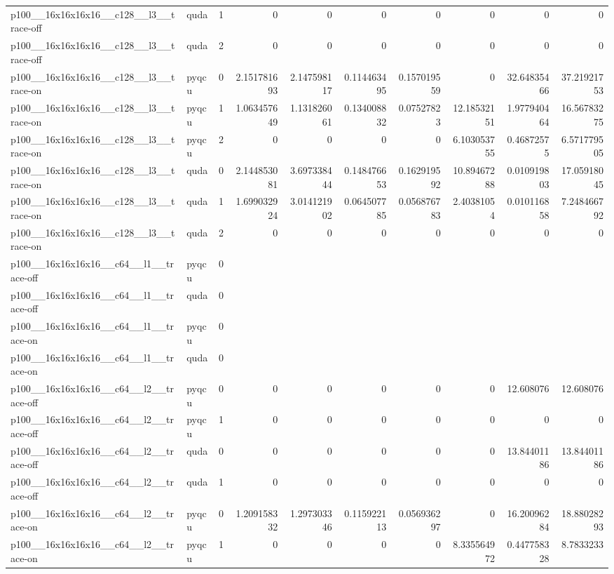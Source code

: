\begin{table}[htbp]
\begin{tabular}{@{}llrrrrrrrr@{}}
p100\_\_16x16x16x16\_\_c128\_\_l3\_\_trace-off & quda & 1 & 0 & 0 & 0 & 0 & 0 & 0 & 0 \\
p100\_\_16x16x16x16\_\_c128\_\_l3\_\_trace-off & quda & 2 & 0 & 0 & 0 & 0 & 0 & 0 & 0 \\
p100\_\_16x16x16x16\_\_c128\_\_l3\_\_trace-on & pyqcu & 0 & 2.151781693 & 2.147598117 & 0.114463495 & 0.157019559 & 0 & 32.64835466 & 37.21921753 \\
p100\_\_16x16x16x16\_\_c128\_\_l3\_\_trace-on & pyqcu & 1 & 1.063457649 & 1.131826061 & 0.134008832 & 0.07527823 & 12.18532151 & 1.977940464 & 16.56783275 \\
p100\_\_16x16x16x16\_\_c128\_\_l3\_\_trace-on & pyqcu & 2 & 0 & 0 & 0 & 0 & 6.103053755 & 0.46872575 & 6.571779505 \\
p100\_\_16x16x16x16\_\_c128\_\_l3\_\_trace-on & quda & 0 & 2.144853081 & 3.697338444 & 0.148476653 & 0.162919592 & 10.89467288 & 0.010919803 & 17.05918045 \\
p100\_\_16x16x16x16\_\_c128\_\_l3\_\_trace-on & quda & 1 & 1.699032924 & 3.014121902 & 0.064507785 & 0.056876783 & 2.40381054 & 0.010116858 & 7.248466792 \\
p100\_\_16x16x16x16\_\_c128\_\_l3\_\_trace-on & quda & 2 & 0 & 0 & 0 & 0 & 0 & 0 & 0 \\
p100\_\_16x16x16x16\_\_c64\_\_l1\_\_trace-off & pyqcu & 0 &  &  &  &  &  &  &  \\
p100\_\_16x16x16x16\_\_c64\_\_l1\_\_trace-off & quda & 0 &  &  &  &  &  &  &  \\
p100\_\_16x16x16x16\_\_c64\_\_l1\_\_trace-on & pyqcu & 0 &  &  &  &  &  &  &  \\
p100\_\_16x16x16x16\_\_c64\_\_l1\_\_trace-on & quda & 0 &  &  &  &  &  &  &  \\
p100\_\_16x16x16x16\_\_c64\_\_l2\_\_trace-off & pyqcu & 0 & 0 & 0 & 0 & 0 & 0 & 12.608076 & 12.608076 \\
p100\_\_16x16x16x16\_\_c64\_\_l2\_\_trace-off & pyqcu & 1 & 0 & 0 & 0 & 0 & 0 & 0 & 0 \\
p100\_\_16x16x16x16\_\_c64\_\_l2\_\_trace-off & quda & 0 & 0 & 0 & 0 & 0 & 0 & 13.84401186 & 13.84401186 \\
p100\_\_16x16x16x16\_\_c64\_\_l2\_\_trace-off & quda & 1 & 0 & 0 & 0 & 0 & 0 & 0 & 0 \\
p100\_\_16x16x16x16\_\_c64\_\_l2\_\_trace-on & pyqcu & 0 & 1.209158332 & 1.297303346 & 0.115922113 & 0.056936297 & 0 & 16.20096284 & 18.88028293 \\
p100\_\_16x16x16x16\_\_c64\_\_l2\_\_trace-on & pyqcu & 1 & 0 & 0 & 0 & 0 & 8.335564972 & 0.447758328 & 8.7833233 \\

\end{tabular}
\end{table}
